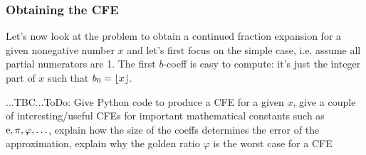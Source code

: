 




\subsubsection{Obtaining the CFE}
Let's now look at the problem to obtain a continued fraction expansion for a given nonegative number $x$ and let's first focus on the simple case, i.e. assume all partial numerators are 1. The first $b$-coeff is easy to compute: it's just the integer part of $x$ such that $b_0 = \lfloor x\rfloor$. 


...TBC...ToDo: Give Python code to produce a CFE for a given $x$, give a couple of interesting/useful CFEs for important mathematical constants such as $\operatorname{\mathrm{e}}, \pi, \varphi, \ldots$, explain how the size of the coeffs determines the error of the approximation, explain why the golden ratio $\varphi$ is the worst case for a CFE









